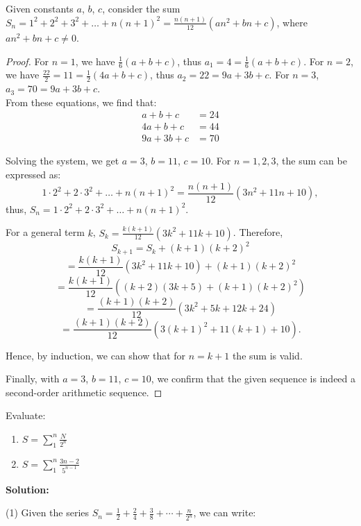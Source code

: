\documentclass[
	12pt, %
	fleqn, %
	a4paper, %
]{LegrandOrangeBook}
\begin{document}
\begin{exercise}
    Given constants $a$, $b$, $c$, consider the sum $S_n = 1^2 + 2^2 + 3^2 + \ldots + n(n+1)^2 = \frac{n(n+1)}{12}(an^2 + bn + c)$, where $an^2 + bn + c \neq 0$.
\end{exercise}
\begin{proof}
    For $n=1$, we have $\frac{1}{6}(a+b+c)$, thus $a_1 = 4 = \frac{1}{6}(a+b+c)$.
For $n=2$, we have $\frac{22}{2} = 11 = \frac{1}{2}(4a+b+c)$, thus $a_2 = 22 = 9a + 3b + c$.
For $n=3$, $a_3 = 70 = 9a + 3b + c$.\\

From these equations, we find that:
\begin{align*}
    a + b + c &= 24 \\
    4a + b + c &= 44 \\
    9a + 3b + c &= 70
\end{align*}

Solving the system, we get $a=3$, $b=11$, $c=10$.
For \(n = 1, 2, 3\), the sum can be expressed as:
\[
1 \cdot 2^2 + 2 \cdot 3^2 + \ldots + n(n+1)^2 = \frac{n(n+1)}{12}(3n^2 + 11n + 10),
\]
thus, \(S_n = 1 \cdot 2^2 + 2 \cdot 3^2 + \ldots + n(n+1)^2\).

For a general term \(k\), \(S_k = \frac{k(k+1)}{12}(3k^2 + 11k + 10)\). Therefore,
\[
S_{k+1} = S_k + (k+1)(k+2)^2
\]
\[
= \frac{k(k+1)}{12}(3k^2 + 11k + 10) + (k+1)(k+2)^2
\]
\[
= \frac{k(k+1)}{12}((k+2)(3k+5) + (k+1)(k+2)^2)
\]
\[
= \frac{(k+1)(k+2)}{12}(3k^2 + 5k + 12k + 24)
\]
\[
= \frac{(k+1)(k+2)}{12}(3(k+1)^2 + 11(k+1) + 10).
\]

Hence, by induction, we can show that for \(n = k+1\) the sum is valid.

Finally, with \(a = 3\), \(b = 11\), \(c = 10\), we confirm that the given sequence is indeed a second-order arithmetic sequence.
\end{proof}

\begin{exercise}
    Evaluate:
    \begin{enumerate}
        \item $S = \sum_{1}^{n} \frac{N}{2^n}$
        \\
        \item $S = \sum_{1}^{n} \frac{3n-2}{5^{n-1}}$  
    \end{enumerate}
\end{exercise}

\textbf{Solution:}

(1) Given the series \( S_n = \frac{1}{2} + \frac{2}{4} + \frac{3}{8} + \cdots + \frac{n}{2^n} \), we can write:
\end{document}
